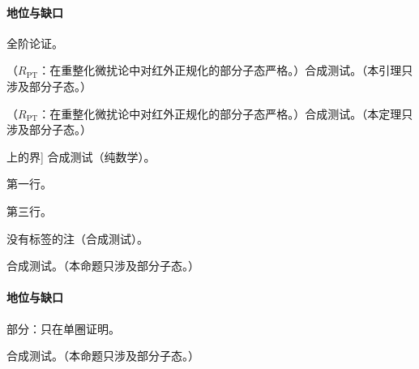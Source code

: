 \paragraph{地位与缺口}全阶论证。

\begin{lemma}\label{lem:dis-twouses}
（$R_{\mathrm{PT}}$：在重整化微扰论中对红外正规化的部分子态严格。）合成测试。（本引理只涉及部分子态。）
\end{lemma}

\begin{theorem}\label{thm:dis-nouses}
（$R_{\mathrm{PT}}$：在重整化微扰论中对红外正规化的部分子态严格。）合成测试。（本定理只涉及部分子态。）
\end{theorem}

\begin{lemma}[区间 [0,1] 上的界]\label{lem:dis-brackets}
合成测试（纯数学）。
\end{lemma}

\begin{definition}[标签位置]
第一行。

第三行。
\label{def:dis-latelabel}
\end{definition}

\begin{remark}
没有标签的注（合成测试）。
\end{remark}

\begin{proposition}\label{prop:dis-weakened}
合成测试。（本命题只涉及部分子态。）
\end{proposition}

\paragraph{地位与缺口}部分：只在单圈证明\cite{Collins2011}。

\begin{proposition}\label{prop:dis-strengthened}
合成测试。（本命题只涉及部分子态。）
\end{proposition}

